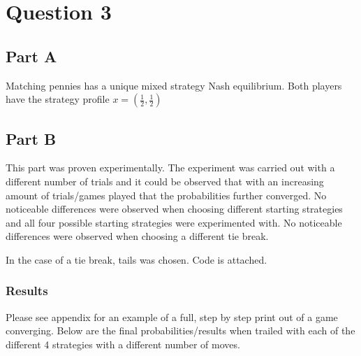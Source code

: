\documentclass[11pt]{article}
\begin{document}
\section{Question 3}

\subsection{Part A}
Matching pennies has a unique mixed strategy Nash equilibrium. Both players have the strategy profile $x = (\frac{1}{2}, \frac{1}{2})$

\subsection{Part B}

This part was proven experimentally. The experiment was carried out with a different number of trials and it could be observed that with an increasing amount of trials/games played that the probabilities further converged. No noticeable differences were observed when choosing different starting strategies and all four possible starting strategies were experimented with. No noticeable differences were observed when choosing a different tie break.

In the case of a tie break, tails was chosen. Code is attached.

\subsubsection*{Results}
Please see appendix for an example of a full, step by step print out of a game converging. Below are the final probabilities/results when trailed with each of the different 4 strategies with a different number of moves.
\end{document}
